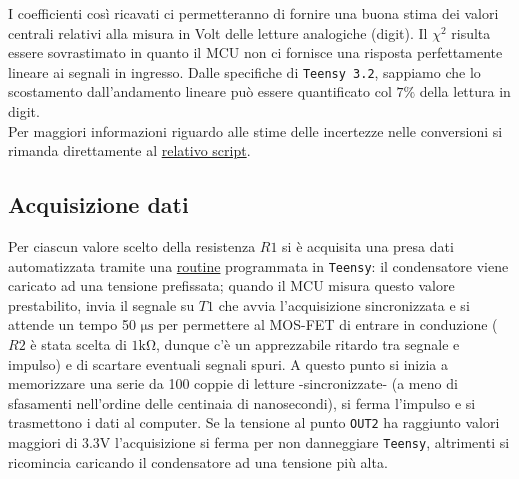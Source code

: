 \documentclass{article}[a4paper, oneside, 11pt]
\begin{document}
I coefficienti cos\`i ricavati ci permetteranno di fornire una buona stima 
dei valori centrali relativi alla misura in Volt delle letture analogiche 
(digit). Il $\chi^2$ risulta essere sovrastimato in quanto il MCU non ci 
fornisce una risposta perfettamente lineare ai segnali in ingresso. Dalle 
specifiche di \verb+Teensy 3.2+, sappiamo che lo scostamento dall'andamento
lineare pu\`o essere quantificato col $7 \%$ della lettura in digit.\\
Per maggiori informazioni riguardo alle stime delle incertezze nelle 
conversioni si rimanda direttamente al 
\href{https://github.com/LucaCiucci/relaz_seme/blob/master/Cartella_fit/funzioni.py}
{relativo script}.

\subsection{Acquisizione dati}
Per ciascun valore scelto della resistenza $R1$ si \`e acquisita una presa 
dati automatizzata tramite una 
\href{https://github.com/LucaCiucci/relaz_seme/blob/master/sketches/teensy_differenziale_definitivo/teensy_differenziale_definitivo.ino}
{routine} programmata in \verb+Teensy+: il condensatore viene caricato ad una
tensione prefissata; quando il MCU misura questo valore prestabilito,
invia il segnale su $T1$ che avvia l'acquisizione sincronizzata e si attende
un tempo 50 $\si{\us}$ per permettere al MOS-FET di entrare in conduzione
($R2$ \`e stata scelta di $1 \si{\kohm}$, dunque c'\`e un apprezzabile ritardo
tra segnale e impulso) e di scartare eventuali segnali spuri.
A questo punto si inizia a memorizzare una serie da 100 coppie di letture
-sincronizzate- (a meno di sfasamenti nell'ordine delle centinaia di
nanosecondi), si ferma l'impulso e si trasmettono i dati al computer.
Se la tensione al punto \verb+OUT2+ ha raggiunto valori maggiori di $3.3\si{\V}$
l'acquisizione si ferma per non danneggiare \verb+Teensy+, altrimenti si
ricomincia caricando il condensatore ad una tensione pi\`u alta.

\end{document}

